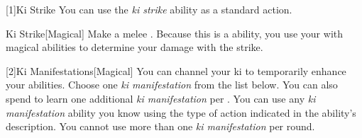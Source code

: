         [1]{Ki Strike} You can use the \textit{ki strike} ability as a standard action.
        \begin{freeability}{Ki Strike}[Magical]
            Make a melee .
            Because this is a  ability, you use your  with magical abilities to determine your damage with the strike.
        \end{freeability}

        [2]{Ki Manifestations}[Magical]
        You can channel your ki to temporarily enhance your abilities.
        Choose one \textit{ki manifestation} from the list below.
        You can also spend  to learn one additional \textit{ki manifestation} per .
        You can use any \textit{ki manifestation} ability you know using the type of action indicated in the ability's description.
        You cannot use more than one \textit{ki manifestation} per round.

